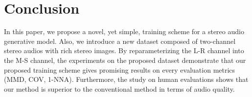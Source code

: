 \section{Conclusion}
\label{sec:conclusion}
In this paper, we propose a novel, yet simple, training scheme for a stereo audio generative model. Also, we introduce a new dataset composed of two-channel stereo audios with rich stereo images. By reparameterizing the L-R channel into the M-S channel, the experiments on the proposed dataset demonstrate that our proposed training scheme gives promising results on every evaluation metrics (MMD, COV, 1-NNA). Furthermore, the study on human evaluations shows that our method is superior to the conventional method in terms of audio quality.